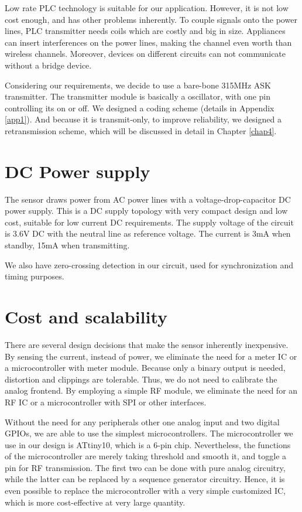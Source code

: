 Low rate PLC technology is suitable for our application. However, it is not low cost enough, and has other problems inherently. To couple signals onto the power lines, PLC transmitter needs coils which are costly and big in size. Appliances can insert interferences on the power lines, making the channel even worth than wireless channels. Moreover, devices on different circuits can not communicate without a bridge device. 

Considering our requirements, we decide to use a bare-bone 315MHz ASK transmitter. The transmitter module is basically a oscillator, with one pin controlling its on or off. We designed a coding scheme (details in Appendix \ref{app1}). And because it is transmit-only, to improve reliability, we designed a retransmission scheme, which will be discussed in detail in Chapter \ref{chap4}. 

\section{DC Power supply}

The sensor draws power from AC power lines with a voltage-drop-capacitor DC power supply. This is a DC supply topology with very compact design and low cost, suitable for low current DC requirements. The supply voltage of the circuit is 3.6V DC with the neutral line as reference voltage. The current is 3mA when standby, 15mA when transmitting. 

We also have zero-crossing detection in our circuit, used for synchronization and timing purposes. 

\section{Cost and scalability}

There are several design decisions that make the sensor inherently inexpensive. By sensing the current, instead of power, we eliminate the need for a meter IC or a microcontroller with meter module. Because only a binary output is needed, distortion and clippings are tolerable. Thus, we do not need to calibrate the analog frontend. By employing a simple RF module, we eliminate the need for an RF IC or a microcontroller with SPI or other interfaces. 

Without the need for any peripherals other one analog input and two digital GPIOs, we are able to use the simplest microcontrollers. The microcontroller we use in our design is ATtiny10, which is a 6-pin chip. Nevertheless, the functions of the microcontroller are merely taking threshold and smooth it, and toggle a pin for RF transmission. The first two can be done with pure analog circuitry, while the latter can be replaced by a sequence generator circuitry. Hence, it is even possible to replace the microcontroller with a very simple customized IC, which is more cost-effective at very large quantity. 

